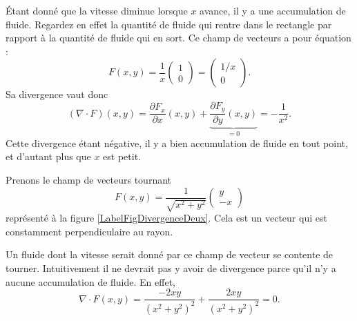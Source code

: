 Étant donné que la vitesse diminue lorsque $x$ avance, il y a une accumulation de fluide. Regardez en effet la quantité de fluide qui rentre dans le rectangle par rapport à la quantité de fluide qui en sort. Ce champ de vecteurs a pour équation :
\begin{equation}
    F(x,y)=\frac{1}{ x }\begin{pmatrix}
        1    \\ 
        0    
    \end{pmatrix}=\begin{pmatrix}
        1/x    \\ 
        0    
    \end{pmatrix}.
\end{equation}
Sa divergence vaut donc
\begin{equation}
    (\nabla\cdot F)(x,y)=\frac{ \partial F_x }{ \partial x }(x,y)+\underbrace{\frac{ \partial F_y }{ \partial y }(x,y)}_{=0}=-\frac{1}{ x^2 }.
\end{equation}
Cette divergence étant négative, il y a bien accumulation de fluide en tout point, et d'autant plus que $x$ est petit.

\begin{example}     \label{ExamDivFrotOM}

    Prenons le champ de vecteurs tournant
    \begin{equation}
        F(x,y)=\frac{1}{ \sqrt{x^2+y^2} }\begin{pmatrix}
            y    \\ 
            -x    
        \end{pmatrix}
    \end{equation}
    représenté à la figure \ref{LabelFigDivergenceDeux}. Cela est un vecteur qui est constamment perpendiculaire au rayon.

    \newcommand{\CaptionFigDivergenceDeux}{Le champ de vecteurs $F(x,y)=(y,-x)$.}
    

    Un fluide dont la vitesse serait donné par ce champ de vecteur se contente de tourner. Intuitivement il ne devrait pas y avoir de divergence parce qu'il n'y a aucune accumulation de fluide. En effet,
    \begin{equation}
        \nabla\cdot F(x,y)=\frac{ -2xy }{ (x^2+y^2)^2 }+\frac{ 2xy }{ (x^2+y^2)^2 }=0.
    \end{equation}
\end{example}

